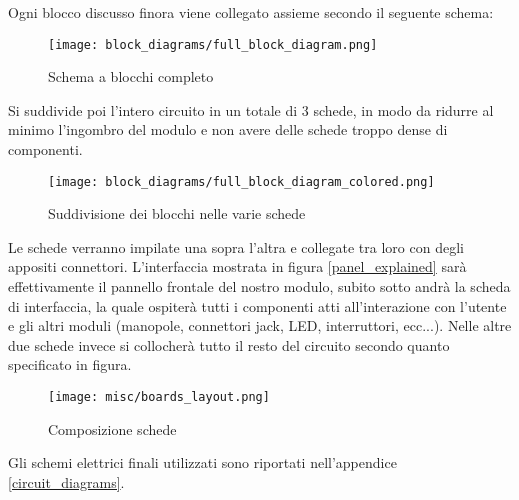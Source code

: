 



Ogni blocco discusso finora viene collegato assieme secondo il seguente schema:

\begin{figure}[H]
    \centering
    \texttt{[image: block\_diagrams/full\_block\_diagram.png]}
    \caption{Schema a blocchi completo}
    \label{full_block_diagram}
\end{figure}

Si suddivide poi l'intero circuito in un totale di 3 schede, in modo da ridurre al
minimo l'ingombro del modulo e non avere delle schede troppo dense di componenti.

\begin{figure}[H]
    \centering
    \texttt{[image: block\_diagrams/full\_block\_diagram\_colored.png]}
    \caption{Suddivisione dei blocchi nelle varie schede}
    \label{full_block_diagram_colored}
\end{figure}

Le schede verranno impilate una sopra l'altra e collegate tra loro con degli appositi connettori.
L'interfaccia mostrata in figura \ref{panel_explained} sarà effettivamente il pannello
frontale del nostro modulo, subito sotto andrà la scheda di interfaccia, la quale ospiterà
tutti i componenti atti all'interazione con l'utente e gli altri moduli (manopole, connettori
jack, LED, interruttori, ecc...). Nelle altre due schede invece si collocherà tutto il resto
del circuito secondo quanto specificato in figura.

\begin{figure}[H]
    \centering
    \texttt{[image: misc/boards\_layout.png]}
    \caption{Composizione schede}
    \label{boards_layout}
\end{figure}

Gli schemi elettrici finali utilizzati sono riportati nell'appendice \ref{circuit_diagrams}.




